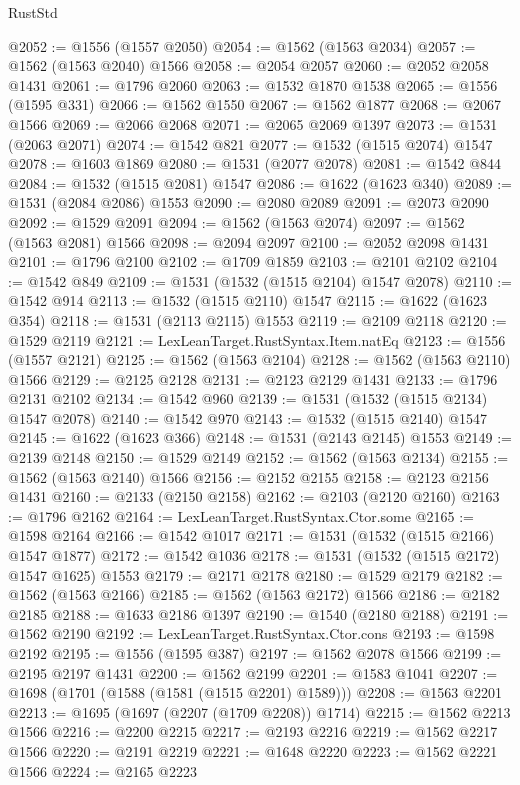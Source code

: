 \begin{lexlean}{RustStd}
\begin{coremodule}
{\begin{coremodule}
{{{{{{{{{{{{{{{{{{{{{{{{{{{{{{{{@2052 := @1556 (@1557 @2050)
@2054 := @1562 (@1563 @2034)
@2057 := @1562 (@1563 @2040) @1566
@2058 := @2054 @2057
@2060 := @2052 @2058 @1431
@2061 := @1796 @2060
@2063 := @1532 @1870 @1538
@2065 := @1556 (@1595 @331)
@2066 := @1562 @1550
@2067 := @1562 @1877
@2068 := @2067 @1566
@2069 := @2066 @2068
@2071 := @2065 @2069 @1397
@2073 := @1531 (@2063 @2071)
@2074 := @1542 @821
@2077 := @1532 (@1515 @2074) @1547
@2078 := @1603 @1869
@2080 := @1531 (@2077 @2078)
@2081 := @1542 @844
@2084 := @1532 (@1515 @2081) @1547
@2086 := @1622 (@1623 @340)
@2089 := @1531 (@2084 @2086) @1553
@2090 := @2080 @2089
@2091 := @2073 @2090
@2092 := @1529 @2091
@2094 := @1562 (@1563 @2074)
@2097 := @1562 (@1563 @2081) @1566
@2098 := @2094 @2097
@2100 := @2052 @2098 @1431
@2101 := @1796 @2100
@2102 := @1709 @1859
@2103 := @2101 @2102
@2104 := @1542 @849
@2109 := @1531 (@1532 (@1515 @2104) @1547 @2078)
@2110 := @1542 @914
@2113 := @1532 (@1515 @2110) @1547
@2115 := @1622 (@1623 @354)
@2118 := @1531 (@2113 @2115) @1553
@2119 := @2109 @2118
@2120 := @1529 @2119
@2121 := LexLeanTarget.RustSyntax.Item.natEq
@2123 := @1556 (@1557 @2121)
@2125 := @1562 (@1563 @2104)
@2128 := @1562 (@1563 @2110) @1566
@2129 := @2125 @2128
@2131 := @2123 @2129 @1431
@2133 := @1796 @2131 @2102
@2134 := @1542 @960
@2139 := @1531 (@1532 (@1515 @2134) @1547 @2078)
@2140 := @1542 @970
@2143 := @1532 (@1515 @2140) @1547
@2145 := @1622 (@1623 @366)
@2148 := @1531 (@2143 @2145) @1553
@2149 := @2139 @2148
@2150 := @1529 @2149
@2152 := @1562 (@1563 @2134)
@2155 := @1562 (@1563 @2140) @1566
@2156 := @2152 @2155
@2158 := @2123 @2156 @1431
@2160 := @2133 (@2150 @2158)
@2162 := @2103 (@2120 @2160)
@2163 := @1796 @2162
@2164 := LexLeanTarget.RustSyntax.Ctor.some
@2165 := @1598 @2164
@2166 := @1542 @1017
@2171 := @1531 (@1532 (@1515 @2166) @1547 @1877)
@2172 := @1542 @1036
@2178 := @1531 (@1532 (@1515 @2172) @1547 @1625) @1553
@2179 := @2171 @2178
@2180 := @1529 @2179
@2182 := @1562 (@1563 @2166)
@2185 := @1562 (@1563 @2172) @1566
@2186 := @2182 @2185
@2188 := @1633 @2186 @1397
@2190 := @1540 (@2180 @2188)
@2191 := @1562 @2190
@2192 := LexLeanTarget.RustSyntax.Ctor.cons
@2193 := @1598 @2192
@2195 := @1556 (@1595 @387)
@2197 := @1562 @2078 @1566
@2199 := @2195 @2197 @1431
@2200 := @1562 @2199
@2201 := @1583 @1041
@2207 := @1698 (@1701 (@1588 (@1581 (@1515 @2201) @1589)))
@2208 := @1563 @2201
@2213 := @1695 (@1697 (@2207 (@1709 @2208)) @1714)
@2215 := @1562 @2213 @1566
@2216 := @2200 @2215
@2217 := @2193 @2216
@2219 := @1562 @2217 @1566
@2220 := @2191 @2219
@2221 := @1648 @2220
@2223 := @1562 @2221 @1566
@2224 := @2165 @2223
}}}}}}}}}}}}}}}}}}}}}}}}}}}}}}}}
\end{coremodule}}
\end{coremodule}
\end{lexlean}
